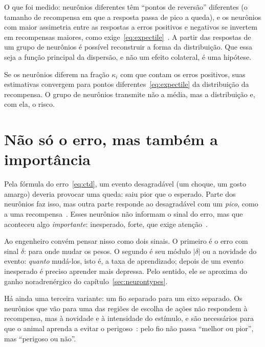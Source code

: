 O que foi medido: neurônios  diferentes têm ``pontos de reversão'' diferentes (o tamanho de recompensa em que a resposta passa de pico a queda), e os neurônios com maior assimetria entre as respostas a erros positivos e negativos se invertem em recompensas maiores, como exige~\eqref{eq:expectile}~\cite{Dabney2020}. A partir das respostas de um grupo de neurônios é possível reconstruir a forma da distribuição. Que essa seja a função principal da dispersão, e não um efeito colateral, é uma hipótese.

\begin{keyblock}
\begin{proposition}
\label{prop:expectile}
Se os neurônios  diferem na fração $\kappa_i$ com que contam os erros positivos, suas estimativas convergem para pontos diferentes~\eqref{eq:expectile} da distribuição da recompensa. O grupo de neurônios transmite não a média, mas a distribuição e, com ela, o risco.
\end{proposition}
\end{keyblock}

\section{Não só o erro, mas também a importância}

Pela fórmula do erro~\eqref{eq:ctd}, um evento desagradável (um choque, um gosto amargo) deveria provocar uma queda: saiu pior que o esperado. Parte dos neurônios  faz isso, mas outra parte responde ao desagradável com um \emph{pico}, como a uma recompensa~\cite{Matsumoto2009}. Esses neurônios não informam o sinal do erro, mas que aconteceu algo \emph{importante}: inesperado, forte, que exige atenção~\cite{BrombergMartin2010}.

Ao engenheiro convém pensar nisso como dois sinais. O primeiro é o erro com sinal $\delta$: para onde mudar os pesos. O segundo é seu módulo $|\delta|$ ou a novidade do evento: \emph{quanto} mudá-los, isto é, a taxa de aprendizado; depois de um evento inesperado é preciso aprender mais depressa. Pelo sentido, ele se aproxima do ganho noradrenérgico do capítulo~\ref{sec:neurontypes}.

Há ainda uma terceira variante: um fio separado para um eixo separado. Os neurônios  que vão para uma das regiões de escolha de ações não respondem à recompensa, mas à novidade e à intensidade do estímulo, e são necessários para que o animal aprenda a evitar o perigoso~\cite{Menegas2018}: pelo fio não passa ``melhor ou pior'', mas ``perigoso ou não''.

